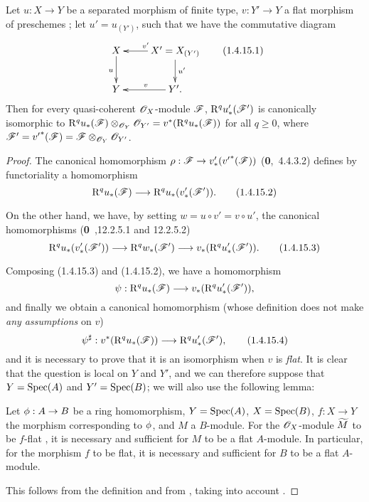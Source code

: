 \begin{prop}[1.4.15]
\label{3.1.4.15}
Let $u:X\to Y$ be a separated morphism of finite type, $v:Y'\to Y$ a flat morphism of preschemes ; let $u'=u_{(Y')}$, such that we have the commutative diagram
\[
  \xymatrix{
    X\ar[d]_u &
    X'=X_{(Y')}\ar[l]_{v'}\ar[d]^{u'}\\
    Y &
    Y'\ar[l]_{v}.
  }
  \tag{1.4.15.1}
\]
Then for every quasi-coherent $\mathscr{O}_X$-module $\mathscr{F}$, $\mathrm{R}^q u_*'(\mathscr{F}')$ is canonically isomorphic to $\mathrm{R}^q u_*(\mathscr{F})\otimes_{\mathscr{O}_Y}\mathscr{O}_{Y'}=v^*(\mathrm{R}^q u_*(\mathscr{F}))$ for all $q\geq 0$, where $\mathscr{F}'={v'}^*(\mathscr{F})=\mathscr{F}\otimes_{\mathscr{O}_Y}\mathscr{O}_{Y'}$.
\end{prop}

\begin{proof}
\label{proof-3.1.4.15}
The canonical homomorphism $\rho:\sh{F}\to v_*'({v'}^*(\sh{F}))$ (\textbf{0},~4.4.3.2) defines by functoriality a homomorphism
\[
  \RR^q u_*(\sh{F})\to\RR^q u_*(v_*'(\sh{F}')).
  \tag{1.4.15.2}
\]

On the other hand, we have, by setting $w=u\circ v'=v\circ u'$, the canonical homomorphisms (\textbf{0}~,12.2.5.1 and 12.2.5.2)
\[
  \RR^q u_*(v_*'(\sh{F}'))\to\RR^q w_*(\sh{F}')\to v_*(\RR^q u_*'(\sh{F}')).
  \tag{1.4.15.3}
\]

Composing (1.4.15.3) and (1.4.15.2), we have a homomorphism
\[
  \psi:\RR^q u_*(\sh{F})\to v_*(\RR^q u_*'(\sh{F}')),
\]
and finally we obtain a canonical homomorphism (whose definition does not make \emph{any assumptions} on $v$)
\[
  \psi^\sharp:v^*(\RR^q u_*(\sh{F}))\to\RR^q u_*'(\sh{F}'),
  \tag{1.4.15.4}
\]
and it is necessary to prove that it is an isomorphism when $v$ is \emph{flat}.
It is clear that the question is local on $Y$ and $Y'$, and we can therefore suppose that $Y={\mathop{\mathrm{Spec}}\nolimits}(A)$ and $Y'={\mathop{\mathrm{Spec}}\nolimits}(B)$; we will also use the following lemma:
\begin{lem}[1.4.15.5]
\label{3.1.4.15.5}
Let $\vphi:A\to B$ be a ring homomorphism, $Y={\mathop{\mathrm{Spec}}\nolimits}(A)$, $X={\mathop{\mathrm{Spec}}\nolimits}(B)$, $f:X\to Y$ the morphism corresponding to $\phi$, and $M$ a $B$-module.
For the $\mathscr{O}_X$-module ${\widetilde{M}}$ to be $f$-flat , it is necessary and sufficient for $M$ to be a flat $A$-module.
In particular, for the morphism $f$ to be flat, it is necessary and sufficient for $B$ to be a flat $A$-module.
\end{lem}

This follows from the definition  and from , taking into account .


\end{proof}
